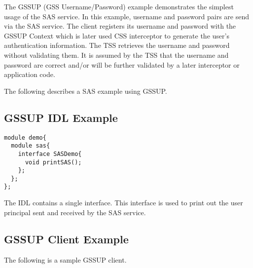 The GSSUP (GSS Username/Password) example demonstrates the simplest 
usage of the SAS service. In this example, username and password
pairs are send via the SAS service. The client registers its username
and password with the GSSUP Context which is later used CSS interceptor
to generate the user's authentication information.
The TSS retrieves the username and password
without validating them. It is assumed by the TSS that the username
and password are correct and/or will be further validated by a later
interceptor or application code.

The following describes a SAS example using GSSUP.

\subsection{GSSUP IDL Example}

\begin{scriptsize}
\begin{verbatim}
module demo{
  module sas{
    interface SASDemo{
      void printSAS();
    };
  };
};
\end{verbatim}
\end{scriptsize}

The IDL contains a single interface. This interface is used to print out
the user principal sent and received by the SAS service.

\subsection{GSSUP Client Example}

The following is a sample GSSUP client.

